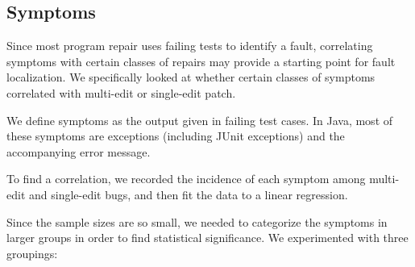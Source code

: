 \subsection{Symptoms}


Since most program repair uses failing tests to identify a fault, correlating 
symptoms with certain classes of repairs may provide a starting point for fault 
localization. We specifically looked at whether certain classes of symptoms correlated with 
multi-edit or single-edit patch.

We define symptoms as the output given in failing test cases. In Java, most of 
these symptoms are exceptions (including JUnit exceptions) and the accompanying error message.

To find a correlation, we recorded the incidence of each symptom among multi-edit and single-edit 
bugs, and then fit the data to a linear regression.

Since the sample sizes are so small, we needed to categorize the symptoms in larger groups in order 
to find statistical significance. We experimented with three groupings:

